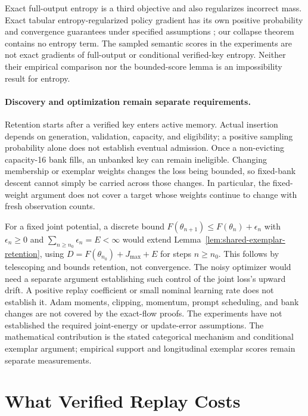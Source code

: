 \documentclass{article}
\newcommand{\1}{\mathbf 1}
\theoremstyle{remark}
\theoremstyle{definition}
\theoremstyle{plain}
\begin{document}
Exact full-output entropy is a third objective and also regularizes incorrect
mass. Exact tabular entropy-regularized policy gradient has its own positive
probability and convergence guarantees under specified assumptions
\citep{mei2020softmaxpg}; our collapse theorem contains no entropy term.
The sampled semantic scores in the experiments are not exact gradients of
full-output or conditional verified-key entropy. Neither their empirical
comparison nor the bounded-score lemma is an impossibility result for entropy.

\paragraph{Discovery and optimization remain separate requirements.}
Retention starts after a verified key enters active memory. Actual insertion
depends on generation, validation, capacity, and eligibility; a positive
sampling probability alone does not establish eventual admission. Once a
non-evicting capacity-16 bank fills, an unbanked key can remain ineligible.
Changing membership or exemplar weights changes the loss being bounded, so
fixed-bank descent cannot simply be carried across those changes. In
particular, the fixed-weight argument does not cover a target whose weights
continue to change with fresh observation counts.

For a fixed joint potential, a discrete bound
$F(\theta_{n+1})\le F(\theta_n)+\epsilon_n$ with
$\epsilon_n\ge0$ and $\sum_{n\ge n_0}\epsilon_n=E<\infty$ would extend
Lemma~\ref{lem:shared-exemplar-retention}, using
$D=F(\theta_{n_0})+J_{\max}+E$ for steps $n\ge n_0$.
This follows by telescoping and bounds retention, not convergence. The noisy
optimizer would need a separate argument establishing such control of the
joint loss's upward drift. A positive replay coefficient or small nominal
learning rate does not establish it. Adam moments, clipping, momentum, prompt
scheduling, and bank changes are not covered by the exact-flow proofs.
The experiments have not established the required joint-energy or
update-error assumptions. The mathematical contribution is the stated
categorical mechanism and conditional exemplar argument; empirical support
and longitudinal exemplar scores remain separate measurements.


\section{What Verified Replay Costs}
\label{app:replay-cost}
\end{document}
